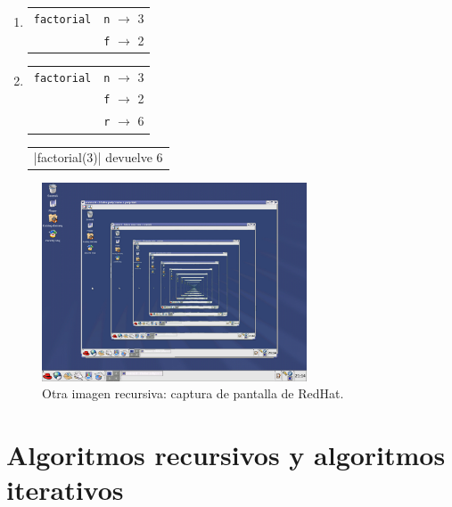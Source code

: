 \begin{enumerate}
\item {}
	\begin{tabular}{r|l|}
	\hline
	\currentframe \verb|factorial| & \verb|n| $\rightarrow$ 3 \\
	                               & \verb|f| $\rightarrow$ 2 \\
	\hline
	\end{tabular}

\item {}
	\begin{tabular}{r|l|}
	\hline
	\currentframe \verb|factorial| & \verb|n| $\rightarrow$ 3 \\
	                               & \verb|f| $\rightarrow$ 2 \\
	                               & \verb|r| $\rightarrow$ 6 \\
	\hline
	\end{tabular}
	\begin{tabular}{l}
    |factorial(3)| devuelve 6
	\end{tabular}

\end{enumerate}

\begin{figure}[ht]
  \centerline{\includegraphics[width=0.7\textwidth]{graficos/recursive}}
  \caption{Otra imagen recursiva: captura de pantalla de RedHat.}
\end{figure}

\section{Algoritmos recursivos y algoritmos iterativos}

